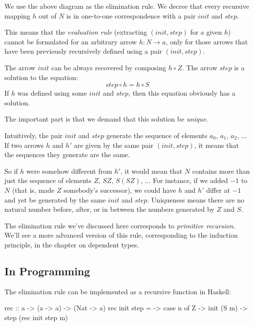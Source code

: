 \documentclass[DaoFP]{subfiles}
\begin{document}
We use the above diagram as the elimination rule. We decree that every recursive mapping $h$ out of $N$ is in one-to-one correspondence with a pair $\mathit{init}$ and $\mathit{step}$. 


This means that the \emph{evaluation rule} (extracting $(\mathit{init}, \mathit{step})$ for a given $h$) cannot be formulated for an arbitrary arrow $h \colon N \to a$, only for those arrows that have been previously recursively defined using a pair $(\mathit{init}, \mathit{step})$. 

The arrow $\mathit{init}$ can be always recovered by composing $h \circ Z$. The arrow $\mathit{step}$ is a solution to the equation:
\[ \mathit{step} \circ h = h \circ S \]
If $h$ was defined using some $\mathit{init}$ and $\mathit{step}$, then this equation obviously has a solution. 

The important part is that we demand that this solution be \emph{unique}. 

Intuitively, the pair $\mathit{init}$ and $\mathit{step}$ generate the sequence of elements $a_0$, $a_1$, $a_2$, ... If two arrows $h$ and $h'$ are given by the same pair $(\mathit{init}, \mathit{step})$, it means that the sequences they generate are the same. 

So if $h$ were somehow different from $h'$,  it would mean that $N$ contains more than just the sequence of elements $Z$, $S Z$, $S(S Z)$, ... For instance, if we added $-1$ to $N$ (that is, made $Z$ somebody's successor), we could have $h$ and $h'$ differ at $-1$ and yet be generated by the same $\mathit{init}$ and $\mathit{step}$. Uniqueness means there are no natural number before, after, or in between the numbers generated by $Z$ and $S$.

The elimination rule we've discussed here corresponds to \emph{primitive recursion}. We'll see a more advanced version of this rule, corresponding to the induction principle, in the chapter on dependent types.

\subsection{In Programming}

The elimination rule can be implemented as a recursive function in Haskell:

\begin{haskell}
rec :: a -> (a -> a) -> (Nat -> a)
rec init step = \n ->
  case n of
    Z     -> init
    (S m) -> step (rec init step m)
\end{haskell}
\end{document}
